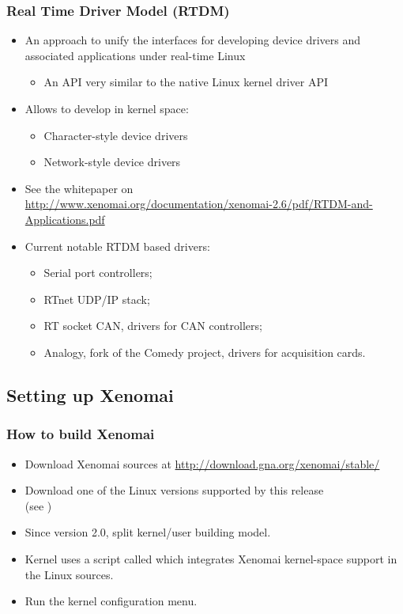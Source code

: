 \begin{frame}
  \frametitle{Real Time Driver Model (RTDM)}
  \begin{itemize}
  \item An approach to unify the interfaces for developing device
    drivers and associated applications under real-time Linux
    \begin{itemize}
    \item An API very similar to the native Linux kernel driver API
    \end{itemize}
  \item Allows to develop in kernel space:
    \begin{itemize}
    \item Character-style device drivers
    \item Network-style device drivers
    \end{itemize}
  \item See the whitepaper on\\
    \url{http://www.xenomai.org/documentation/xenomai-2.6/pdf/RTDM-and-Applications.pdf}
  \item Current notable RTDM based drivers:
    \begin{itemize}
    \item Serial port controllers;
    \item RTnet UDP/IP stack;
    \item RT socket CAN, drivers for CAN controllers;
    \item Analogy, fork of the Comedy project, drivers for acquisition cards.
    \end{itemize}
  \end{itemize}
\end{frame}

\subsection{Setting up Xenomai}

\begin{frame}
  \frametitle{How to build Xenomai}
  \begin{itemize}
  \item Download Xenomai sources at \url{http://download.gna.org/xenomai/stable/}
  \item Download one of the Linux versions supported by this release\\
    (see )
  \item Since version 2.0, split kernel/user building model.
  \item Kernel uses a script called 
    which integrates Xenomai kernel-space support in the Linux
    sources.
  \item Run the kernel configuration menu.
  \end{itemize}
\end{frame}

